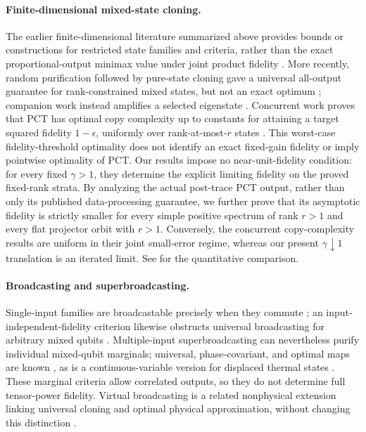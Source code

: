 \documentclass[11pt]{article}
\theoremstyle{remark}
\theoremstyle{plain}
\begin{document}
\paragraph{Finite-dimensional mixed-state cloning.}
The earlier finite-dimensional literature summarized above provides bounds
or constructions for restricted state families and criteria, rather than the
exact proportional-output minimax value under joint product fidelity
\cite{CiracEkertMacchiavello1999,Rastegin2003Upper,
Rastegin2002Relative,Rastegin2003StateDependent,Fan2003,FanLiuShi2007,
Kazakov2007,LemmWilde2017}.
More recently, random purification followed by pure-state cloning gave a
universal all-output guarantee for rank-constrained mixed states, but not an
exact optimum \cite{TangWrightZhandry2025,LiTheilHarrowChuang2026}; companion
work instead amplifies a selected eigenstate
\cite{LiTheilHarrowChuangQPA2026}.  Concurrent work proves that PCT has
optimal copy complexity up to constants for attaining a target squared
fidelity \(1-\epsilon\), uniformly over rank-at-most-\(r\) states
\cite{FanizzaGrinkoScharnhorstSpilecki2026,JeonSohnOh2026}.  This worst-case
fidelity-threshold optimality does not identify an exact fixed-gain fidelity
or imply pointwise optimality of PCT.  Our results impose no
near-unit-fidelity condition: for every fixed \(\gamma>1\), they determine
the explicit limiting fidelity on the proved fixed-rank strata.  By
analyzing the actual post-trace PCT output, rather than only its published
data-processing guarantee, we further prove that its asymptotic fidelity is
strictly smaller for every simple positive spectrum of rank \(r>1\) and
every flat projector orbit with \(r>1\).  Conversely, the concurrent
copy-complexity results are uniform in their joint small-error regime,
whereas our present
\(\gamma\downarrow1\) translation is an iterated limit.  See
 for the quantitative comparison.

\paragraph{Broadcasting and superbroadcasting.}
Single-input families are broadcastable precisely when they commute
\cite{BarnumCavesFuchsJozsaSchumacher1996}; an input-independent-fidelity
criterion likewise obstructs universal broadcasting for arbitrary mixed
qubits \cite{ChenChen2007MixedBroadcast}.  Multiple-input superbroadcasting
can nevertheless purify individual mixed-qubit marginals; universal,
phase-covariant, and optimal maps are known
\cite{DArianoMacchiavelloPerinotti2005,
BuscemiDArianoMacchiavelloPerinotti2005Optimal,
BuscemiDArianoMacchiavelloPerinotti2006,DangFan2007}, as is a
continuous-variable version for displaced thermal states
\cite{DArianoPerinottiSacchi2006Continuous}.  These marginal criteria allow
correlated outputs, so they do not determine full tensor-power fidelity.
Virtual broadcasting is a related nonphysical extension linking universal
cloning and optimal physical approximation, without changing this distinction
\cite{ParzygnatFullwoodBuscemiChiribella2024}.
\end{document}
